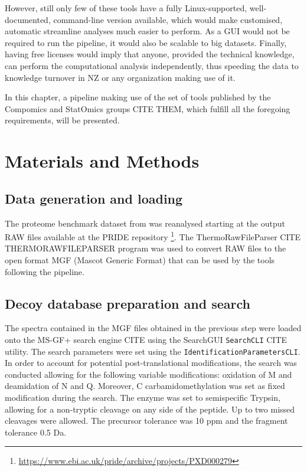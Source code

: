 \documentclass[11pt, a4paper]{report}
\begin{document}
However, still only few of these tools have a fully Linux-supported, well-documented, command-line version available, which would make customised, automatic streamline analyses much easier to perform. As a GUI would not be required to run the pipeline, it would also be scalable to big datasets. Finally, having free licenses would imply that anyone, provided the technical knowledge, can perform the computational analysis independently, thus speeding the data to knowledge turnover in \ac{NZ} or any organization making use of it.

In this chapter, a pipeline making use of the set of tools published by the Compomics  and StatOmics groups CITE THEM, which fulfill all the foregoing requirements, will be presented.

\section{Materials and Methods}

\subsection{Data generation and loading}

The proteome benchmark dataset from \cite{Cox2014} was reanalysed starting at the output RAW files available at the PRIDE repository \footnote{\href{https://www.ebi.ac.uk/pride/archive/projects/PXD000279}{https://www.ebi.ac.uk/pride/archive/projects/PXD000279}}. The ThermoRawFileParser CITE THERMORAWFILEPARSER program was used to convert RAW files to the open format MGF (Mascot Generic Format) that can be used by the tools following the pipeline.


\subsection{Decoy database preparation and search}

The spectra contained in the MGF files obtained in the previous step were loaded onto the MS-GF+ search engine CITE using the SearchGUI \texttt{SearchCLI} CITE utility. The search parameters were set using the \texttt{IdentificationParametersCLI}. In order to account for potential post-translational modifications, the search was conducted allowing for the following variable modifications: oxidation of M and deamidation of N and Q. Moreover, C carbamidomethylation was set as fixed modification during the search. The enzyme was set to semispecific Trypsin, allowing for a non-tryptic cleavage on any side of the peptide. Up to two missed cleavages were allowed. The precursor tolerance was 10 ppm and the fragment tolerance 0.5 Da. 
\end{document}
